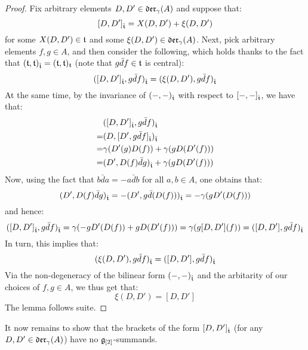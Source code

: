             \begin{proof}
                Fix arbitrary elements $D, D' \in \mathfrak{der}_{\gamma}(A)$ and suppose that:
                    $$[D, D']_{\hat{\mathfrak{t}}} = X(D, D') + \xi(D, D')$$
                for some $X(D, D') \in \mathfrak{t}$ and some $\xi(D, D') \in \mathfrak{der}_{\gamma}(A)$. Next, pick arbitrary elements $f, g \in A$, and then consider the following, which holds thanks to the fact that $(\mathfrak{t}, \mathfrak{t})_{\hat{\mathfrak{t}}} = (\mathfrak{t}, \mathfrak{t})_{\mathfrak{t}}$ (note that $g \bar{d}f \in \mathfrak{t}$ is central):
                    $$( [D, D']_{\hat{\mathfrak{t}}}, g \bar{d}f )_{\hat{\mathfrak{t}}} = ( \xi(D, D'), g \bar{d}f )_{\hat{\mathfrak{t}}}$$
                At the same time, by the invariance of $(-, -)_{\hat{\mathfrak{t}}}$ with respect to $[-, -]_{\hat{\mathfrak{t}}}$, we have that:
                    $$
                        \begin{aligned}
                            & ( [D, D']_{\hat{\mathfrak{t}}}, g \bar{d}f )_{\hat{\mathfrak{t}}}
                            \\
                            = & ( D, [D', g \bar{d}f]_{\hat{\mathfrak{t}}} )_{\hat{\mathfrak{t}}}
                            \\
                            = & \gamma( D'(g) D(f) ) + \gamma( g D(D'(f)) )
                            \\
                            = & ( D', D(f) \bar{d}g )_{\hat{\mathfrak{t}}} + \gamma( g D(D'(f)) )
                        \end{aligned}
                    $$
                Now, using the fact that $b\bar{d}a = -a \bar{d}b$ for all $a, b \in A$, one obtains that:
                    $$( D', D(f) \bar{d}g )_{\hat{\mathfrak{t}}} = -( D', g \bar{d}(D(f)) )_{\hat{\mathfrak{t}}} = -\gamma( g D'(D(f)) )$$
                and hence:
                    $$( [D, D']_{\hat{\mathfrak{t}}}, g \bar{d}f )_{\hat{\mathfrak{t}}} = \gamma( -g D'(D(f)) + g D(D'(f)) ) = \gamma( g[D, D'](f) ) = ([D, D'], g\bar{d}f)_{\hat{\mathfrak{t}}}$$
                In turn, this implies that:
                    $$( \xi(D, D'), g \bar{d}f )_{\hat{\mathfrak{t}}} = ([D, D'], g\bar{d}f)_{\hat{\mathfrak{t}}}$$
                Via the non-degeneracy of the bilinear form $(-, -)_{\hat{\mathfrak{t}}}$ and the arbitarity of our choices of $f, g \in A$, we thus get that:
                    $$\xi(D, D') = [D, D']$$
                The lemma follows suite.
            \end{proof}
        It now remains to show that the brackets of the form $[D, D']_{\hat{\mathfrak{t}}}$ (for any $D, D' \in \mathfrak{der}_{\gamma}(A)$) have no $\mathfrak{g}_{[2]}$-summands.
